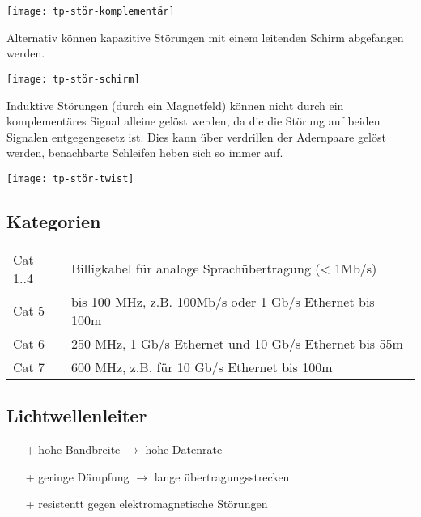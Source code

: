 \begin{center}
	\texttt{[image: tp-stör-komplementär]}
\end{center}

Alternativ können kapazitive Störungen mit einem leitenden Schirm abgefangen werden.

\begin{center}
	\texttt{[image: tp-stör-schirm]}
\end{center}

Induktive Störungen (durch ein Magnetfeld) können nicht durch ein komplementäres Signal alleine gelöst werden, da
die die Störung auf beiden Signalen entgegengesetz ist.
Dies kann über verdrillen der Adernpaare gelöst werden, benachbarte Schleifen heben sich
so immer auf.

\begin{center}
	\texttt{[image: tp-stör-twist]}
\end{center}


\subsection{Kategorien}

\begin{center}
	\begin{tabular}{@{$\bullet \,$}ll}
		Cat 1..4 & Billigkabel für analoge Sprachübertragung (< 1Mb/s)     \\
		Cat 5    & bis 100 MHz, z.B. 100Mb/s oder 1 Gb/s Ethernet bis 100m \\
		Cat 6    & 250 MHz, 1 Gb/s Ethernet und 10 Gb/s Ethernet bis 55m   \\
		Cat 7    & 600 MHz, z.B. für 10 Gb/s Ethernet bis 100m             \\
	\end{tabular}
\end{center}


\subsection{Lichtwellenleiter}

\begin{itemize}
	\item[+] hohe Bandbreite $\rightarrow$ hohe Datenrate
	\item[+] geringe Dämpfung $\rightarrow$ lange übertragungsstrecken
	\item[+] resistentt gegen elektromagnetische Störungen
\end{itemize}

